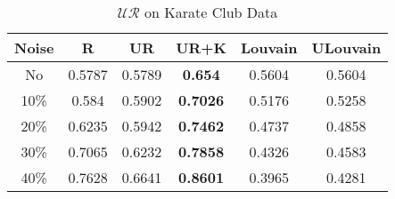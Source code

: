 \documentclass[\main/thesis.tex]{subfiles}
\begin{document}

\begin{table}[h]
\centering
\caption{$\mathcal{UR}$ on Karate Club Data}
\label{unsupervised_karate}
\begin{tabular}{|c|c|c|c|c|c|}
\hline
Noise & R      & UR     & UR+K            & Louvain & ULouvain \\ \hline
No    & 0.5787 & 0.5789 & \textbf{0.654}  & 0.5604  & 0.5604   \\ \hline
10\%  & 0.584  & 0.5902 & \textbf{0.7026} & 0.5176  & 0.5258   \\ \hline
20\%  & 0.6235 & 0.5942 & \textbf{0.7462} & 0.4737  & 0.4858   \\ \hline
30\%  & 0.7065 & 0.6232 & \textbf{0.7858} & 0.4326  & 0.4583   \\ \hline
40\%  & 0.7628 & 0.6641 & \textbf{0.8601} & 0.3965  & 0.4281   \\ \hline
\end{tabular}
\end{table}
\end{document}
